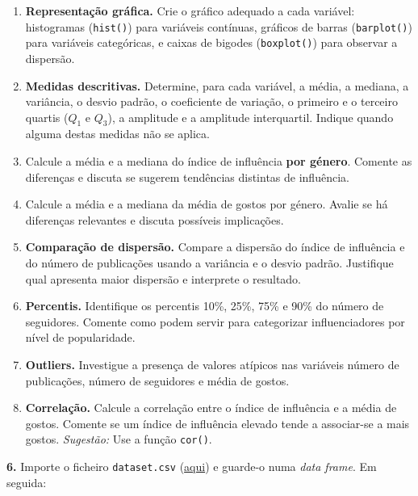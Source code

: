 \documentclass[
  portuguese,
  11pt,
  openany]{book}
\begin{document}
\begin{enumerate}
\def\labelenumi{(\alph{enumi})}
\setcounter{enumi}{2}
\item
  \textbf{Representação gráfica.} Crie o gráfico adequado a cada variável: histogramas
  (\texttt{hist()}) para variáveis contínuas, gráficos de barras (\texttt{barplot()}) para
  variáveis categóricas, e caixas de bigodes (\texttt{boxplot()}) para observar a
  dispersão.
\item
  \textbf{Medidas descritivas.} Determine, para cada variável, a média, a mediana, a
  variância, o desvio padrão, o coeficiente de variação, o primeiro e o terceiro
  quartis (\(Q_1\) e \(Q_3\)), a amplitude e a amplitude interquartil. Indique quando
  alguma destas medidas não se aplica.
\item
  Calcule a média e a mediana do índice de influência \textbf{por género}. Comente as
  diferenças e discuta se sugerem tendências distintas de influência.
\item
  Calcule a média e a mediana da média de gostos por género. Avalie se há
  diferenças relevantes e discuta possíveis implicações.
\item
  \textbf{Comparação de dispersão.} Compare a dispersão do índice de influência e do
  número de publicações usando a variância e o desvio padrão. Justifique qual
  apresenta maior dispersão e interprete o resultado.
\item
  \textbf{Percentis.} Identifique os percentis 10\%, 25\%, 75\% e 90\% do número de
  seguidores. Comente como podem servir para categorizar influenciadores por nível
  de popularidade.
\item
  \textbf{Outliers.} Investigue a presença de valores atípicos nas variáveis número de
  publicações, número de seguidores e média de gostos.
\item
  \textbf{Correlação.} Calcule a correlação entre o índice de influência e a média de
  gostos. Comente se um índice de influência elevado tende a associar-se a mais
  gostos. \emph{Sugestão:} Use a função \texttt{cor()}.
\end{enumerate}

\textbf{6.} Importe o ficheiro \texttt{dataset.csv}
(\href{https://renatorpaula.wixsite.com/renato/laboratorio-estatistica}{aqui}) e
guarde-o numa \emph{data frame}. Em seguida:
\end{document}
